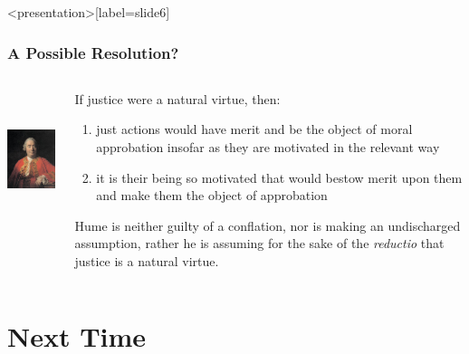% 

\begin{frame}<presentation>[label=slide6]
    \frametitle{A Possible Resolution?}
        \begin{columns}
            \begin{column}{3cm}
                \includegraphics[height=4cm]{../../../graphics/hume.jpg}
            \end{column}
            \begin{column}{7cm}
                If justice were a natural virtue, then:
                    \begin{enumerate}
                        \item just actions would have merit and be the object of moral approbation insofar as they are motivated in the relevant way
                        \item it is their being so motivated that would bestow merit upon them and make them the object of approbation
                    \end{enumerate}
                Hume is neither guilty of a conflation, nor is making an undischarged assumption, rather he is assuming for the sake of the \emph{reductio} that justice is a natural virtue.
            \end{column}
        \end{columns}
\end{frame}


\section{Next Time}\label{sec:next_time} %

